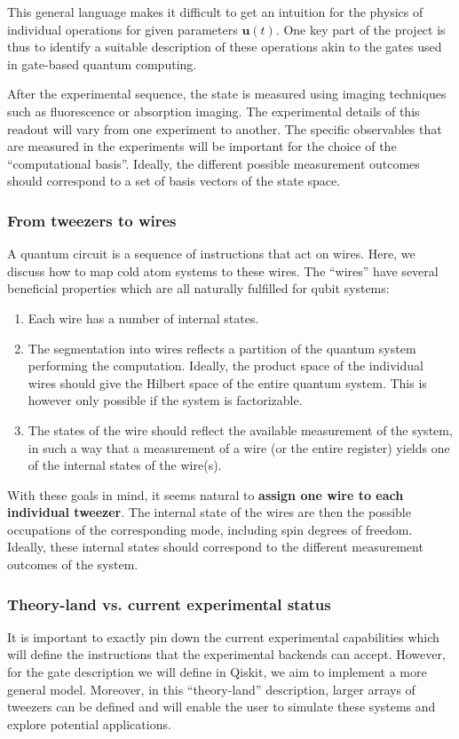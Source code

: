 \documentclass[a4paper, 10pt]{article}
\begin{document}
This general language makes it difficult to get an intuition for the physics of individual operations for given parameters $\boldsymbol{u}(t)$.
One key part of the project is thus to identify a suitable description of these operations akin to the gates used in gate-based quantum computing. 

After the experimental sequence, the state is measured using imaging techniques such as fluorescence or absorption imaging.
The experimental details of this readout will vary from one experiment to another.
The specific observables that are measured in the experiments will be important for the choice of the ``computational basis''.
Ideally, the different possible measurement outcomes should correspond to a set of basis vectors of the state space. 

\subsubsection{From tweezers to wires}

A quantum circuit is a sequence of instructions that act on wires.
Here, we discuss how to map cold atom systems to these wires. The ``wires'' have several beneficial properties which are all naturally fulfilled for qubit systems:

\begin{enumerate}
    \item Each wire has a number of internal states.
    \item The segmentation into wires reflects a partition of the quantum system performing the computation.
    Ideally, the product space of the individual wires should give the Hilbert space of the entire quantum system.
    This is however only possible if the system is factorizable.
    \item The states of the wire should reflect the available measurement of the system, in such a way that a measurement of a wire (or the entire register) yields one of the internal states of the wire(s). 
\end{enumerate}

With these goals in mind, it seems natural to \textbf{assign one wire to each individual tweezer}.
The internal state of the wires are then the possible occupations of the corresponding mode, including spin degrees of freedom.
Ideally, these internal states should correspond to the different measurement outcomes of the system. 

\subsubsection{Theory-land vs. current experimental status}
It is important to exactly pin down the current experimental capabilities which will define the instructions that the experimental backends can accept.
However, for the gate description we will define in Qiskit, we aim to implement a more general model.
Moreover, in this ``theory-land'' description, larger arrays of tweezers can be defined and will enable the user to simulate these systems and explore potential applications.
\end{document}
